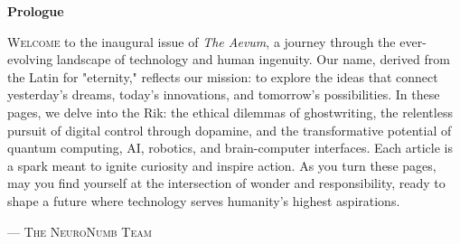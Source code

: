 \documentclass[a4paper,10pt,twocolumn]{memoir}
\begin{document}
\begin{titlingpage}
\thispagestyle{empty}
\begin{center}
\vspace*{1cm}
{\large\bfseries\color{primary}Prologue}
\vspace{0.5cm}
\vspace{0.5cm}
\end{center}
\lettrine[lines=3]{W}{elcome} to the inaugural issue of \textit{The Aevum}, a journey through the ever-evolving landscape of technology and human ingenuity. Our name, derived from the Latin for "eternity," reflects our mission: to explore the ideas that connect yesterday’s dreams, today’s innovations, and tomorrow’s possibilities. In these pages, we delve into the Rik: the ethical dilemmas of ghostwriting, the relentless pursuit of digital control through dopamine, and the transformative potential of quantum computing, AI, robotics, and brain-computer interfaces. Each article is a spark meant to ignite curiosity and inspire action. As you turn these pages, may you find yourself at the intersection of wonder and responsibility, ready to shape a future where technology serves humanity’s highest aspirations. 
\begin{center}
\vspace{0.5cm}
{\small\scshape\color{gray}— The NeuroNumb Team}
\end{center}
\vspace*{\fill}
\end{titlingpage}

\clearpage
\tableofcontents*
\thispagestyle{empty}
\clearpage
\newpage


\end{document}
